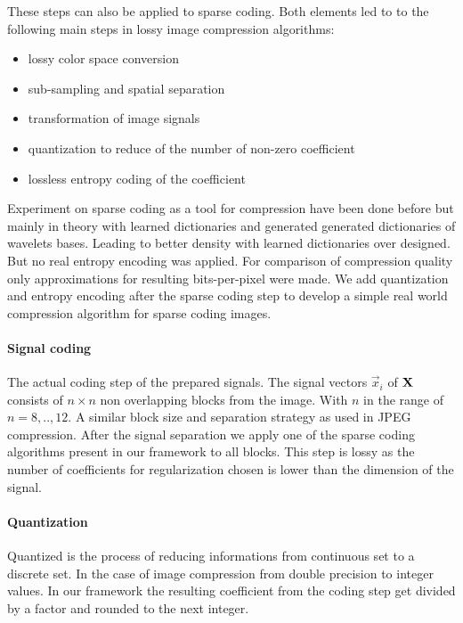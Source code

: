 These steps can also be applied to sparse coding. Both elements
led to to the following main steps in lossy image compression algorithms:
\begin{itemize}
 \item lossy color space conversion
 \item sub-sampling and spatial separation
 \item transformation of image signals
 \item quantization to reduce of the number of non-zero coefficient 
 \item lossless entropy coding of the coefficient 
\end{itemize}


Experiment on sparse coding as a tool for compression have been done
before\cite{Lewicki1999,?} but mainly in theory with learned dictionaries and
generated generated dictionaries of wavelets bases. Leading to better density
with learned dictionaries over designed. But no real entropy encoding was
applied. For comparison of compression quality only approximations for
resulting bits-per-pixel were made. We add quantization and entropy encoding
after the sparse coding step to develop a simple real world compression
algorithm for sparse coding images.



\paragraph{Signal coding}
The actual coding step of the prepared signals. The signal vectors $\vec{x}_i$
of $\boldsymbol{\mathrm{X}}$ consists of $n \times n$ non overlapping blocks from the image.
With $n$ in the range of $n=8,..,12$. A similar block size and separation
strategy as used in JPEG compression. After the signal separation we apply one
of the sparse coding algorithms present in our framework to all blocks. This
step is lossy as the number of coefficients for regularization chosen is lower
than the dimension of the signal. 


\paragraph{Quantization}
Quantized is the process of reducing informations from continuous set to a
discrete set. In the case of image compression from double precision to integer
values. In our framework the resulting coefficient from the coding step get
divided by a factor and rounded to the next integer.  

